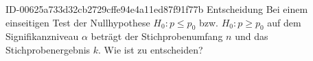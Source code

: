 \begin{exercise}
      {ID-00625a733d32cb2729cffe94e4a11ed87f91f77b}
      {Entscheidung}
  \ifproblem\problem
    Bei einem einseitigen Test der Nullhypothese $H_0:p\leq p_0$ bzw.
    $H_0:p\geq p_0$ auf dem Signifikanzniveau $\alpha$ beträgt der
    Stichprobenumfang $n$ und das Stichprobenergebnis $k$. Wie ist zu
    entscheiden?
    \begin{center}
      \qquad{}\\[1ex]
      \makebox[6em][r]{}\qquad{}
      \\[2ex]
      \qquad{}\\[1ex]
      \makebox[6em][r]{}\qquad{}
    \end{center}
  \fi
\end{exercise}
